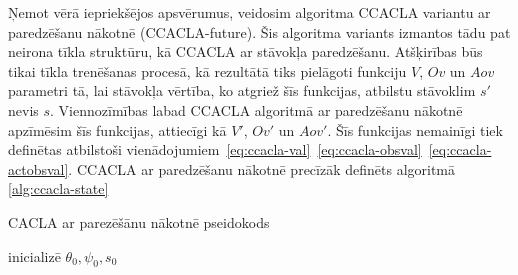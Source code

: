 \documentclass{ludis} %
\begin{document}
Ņemot vērā iepriekšējos apsvērumus, veidosim algoritma CCACLA variantu ar
paredzēšanu nākotnē (CCACLA-future). Šis algoritma variants izmantos tādu pat neirona tīkla
struktūru, kā CCACLA ar stāvokļa paredzēšanu. Atšķirības būs tikai tīkla
trenēšanas procesā, kā rezultātā tiks pielāgoti funkciju $V$, $Ov$ un $Aov$
parametri tā, lai stāvokļa vērtība, ko atgriež šīs funkcijas, atbilstu stāvoklim
$s'$ nevis $s$. Viennozīmības labad CCACLA algoritmā ar paredzēšanu nākotnē
apzīmēsim šīs funkcijas, attiecīgi kā $V'$, $Ov'$ un $Aov'$. Šīs funkcijas
nemainīgi tiek definētas atbilstoši
vienādojumiem~\eqref{eq:ccacla-val}~\eqref{eq:ccacla-obsval}~\eqref{eq:ccacla-actobsval}.
CCACLA ar paredzēšanu nākotnē precīzāk definēts algoritmā \ref{alg:ccacla-state}


\begin{spacing}{1}
\begin{algorithm}
\caption{CACLA ar parezēšānu nākotnē pseidokods}\label{alg:ccacla-future}
inicializē $\theta_0, \psi_0, s_0$ \\
\end{algorithm}
\end{spacing}
\end{document}
